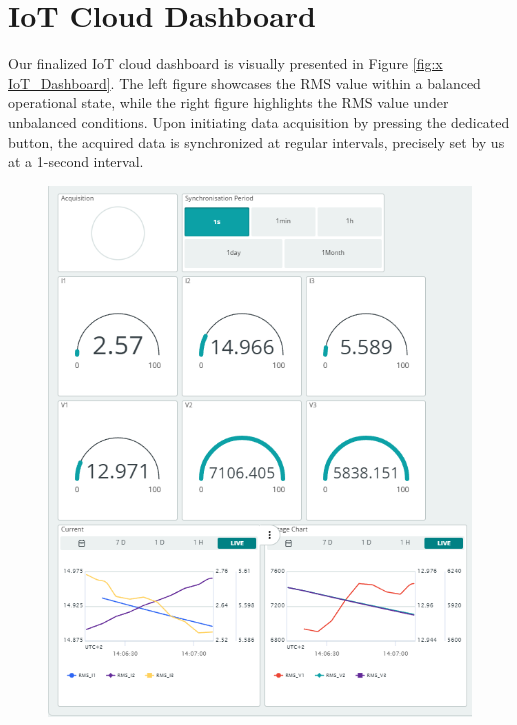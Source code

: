 \section{IoT Cloud Dashboard} 
Our finalized IoT cloud dashboard is visually presented in Figure \ref{fig:x IoT_Dashboard}. The left figure showcases the RMS value within a balanced operational state, while the right figure highlights the RMS value under unbalanced conditions. Upon initiating data acquisition by pressing the dedicated button, the acquired data is synchronized at regular intervals, precisely set by us at a 1-second interval. 
\begin{figure}[htbp]
\centering
\includegraphics[scale=0.59]{images/IoT_Dashboard.png}

\end{figure}
